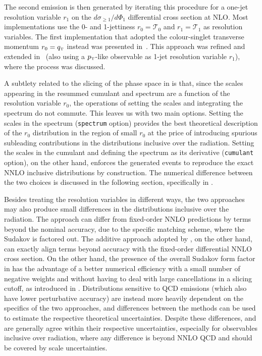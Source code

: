 \documentclass[11pt,a4paper]{article}
\begin{document}
The second emission is then generated by iterating this procedure 
for a one-jet resolution variable $r_1$ on
the $d\sigma_{\geq 1} / d\Phi_1$ differential cross section at NLO. Most
\GENEVA{} implementations use the 0- and 1-jettiness $r_0=\mathcal{T}_0$
and $r_1=\mathcal{T}_1$ as resolution variables. The first implementation
that adopted the colour-singlet transverse momentum
$r_0=q_{\scriptscriptstyle\rm T}$ instead was presented
in~. This approach was refined and extended
in~ (also using a $p_{\scriptscriptstyle\rm
  T}$-like observable as 1-jet resolution variable $r_1$), where the \bbtoH{} process was discussed.

A subtlety related to the slicing of the phase space in \GENEVA{} is
that, since the scales appearing in the resummed cumulant and spectrum
are a function of the resolution variable $r_0$, the operations of
setting the scales and integrating the spectrum do not commute. This
leaves us with two main options. Setting the scales in the spectrum (\texttt{spectrum} option)
provides the best theoretical description of the $r_0$ distribution in
the region of small $r_0$ at the price of introducing spurious
subleading contributions in the distributions inclusive over the
radiation. Setting the scales in the cumulant and defining the
spectrum as its derivative (\texttt{cumulant} option), on the other hand, enforces the generated
events to reproduce the exact NNLO inclusive distributions by
construction. The numerical difference between the two choices is discussed in the following section, specifically in .

Besides treating the resolution variables in different ways, the two
approaches may also produce small differences in the distributions
inclusive over the radiation. The \minnlo{} approach can differ from 
fixed-order NNLO predictions by terms beyond the nominal accuracy,
due to the specific matching scheme, where the Sudakov is factored out.
 The additive approach
adopted by \GENEVA{}, on the other hand, can exactly align 
terms beyond accuracy with the fixed-order differential NNLO cross section.
On the other hand, the presence of the overall Sudakov form factor in
\minnlo{} has the advantage of a better numerical efficiency with a small number of 
negative weights and without having to deal with large cancellations in a
slicing cutoff, as introduced in \GENEVA{}. Distributions sensitive
to QCD emissions 
(which also have lower perturbative accuracy) are instead more heavily
dependent on the specifics of the two approaches, and differences between
the methods can be used to estimate the respective theoretical
uncertainties. Despite these differences, \minnlo{} and \GENEVA{} are generally 
agree within their respective uncertainties, especially for observables inclusive 
over radiation, where any difference is beyond NNLO QCD and should be 
covered by scale uncertainties.
\end{document}
